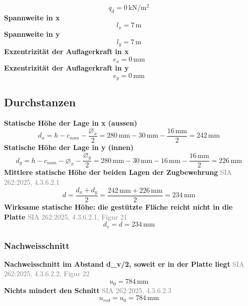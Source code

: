 \documentclass[11pt,a4paper]{article}
\newcommand{\normref}[1]{{\small\textcolor{gray}{#1}}}
\begin{document}
\begin{equation*}
q_d = 0\,\mathrm{kN}/\mathrm{m}^{2}
\end{equation*}
\noindent\textbf{Spannweite in x}
\begin{equation*}
l_x = 7\,\mathrm{m}
\end{equation*}
\noindent\textbf{Spannweite in y}
\begin{equation*}
l_y = 7\,\mathrm{m}
\end{equation*}
\noindent\textbf{Exzentrizität der Auflagerkraft in x}
\begin{equation*}
e_x = 0\,\mathrm{mm}
\end{equation*}
\noindent\textbf{Exzentrizität der Auflagerkraft in y}
\begin{equation*}
e_y = 0\,\mathrm{mm}
\end{equation*}
\subsection{Durchstanzen}
\noindent\textbf{Statische Höhe der Lage in x (aussen)}
\begin{equation*}
d_x = h - c_{nom} - \frac{\varnothing_x}{2} = 280\,\mathrm{mm} - 30\,\mathrm{mm} - \frac{16\,\mathrm{mm}}{2} = 242\,\mathrm{mm}
\end{equation*}
\noindent\textbf{Statische Höhe der Lage in y (innen)}
\begin{equation*}
d_y = h - c_{nom} - \varnothing_x - \frac{\varnothing_y}{2} = 280\,\mathrm{mm} - 30\,\mathrm{mm} - 16\,\mathrm{mm} - \frac{16\,\mathrm{mm}}{2} = 226\,\mathrm{mm}
\end{equation*}
\noindent\textbf{Mittlere statische Höhe der beiden Lagen der Zugbewehrung} \hfill \normref{SIA 262:2025, 4.3.6.2.1}
\begin{equation*}
d = \frac{d_x + d_y}{2} = \frac{242\,\mathrm{mm} + 226\,\mathrm{mm}}{2} = 234\,\mathrm{mm}
\end{equation*}
\noindent\textbf{Wirksame statische Höhe: die gestützte Fläche reicht nicht in die Platte} \hfill \normref{SIA 262:2025, 4.3.6.2.1, Figur 21}
\begin{equation*}
d_v = d = 234\,\mathrm{mm}
\end{equation*}
\subsubsection{Nachweisschnitt}
\noindent\textbf{Nachweisschnitt im Abstand d\_v/2, soweit er in der Platte liegt} \hfill \normref{SIA 262:2025, 4.3.6.2.2, Figur 22}
\begin{equation*}
u_0 = 784\,\mathrm{mm}
\end{equation*}
\noindent\textbf{Nichts mindert den Schnitt} \hfill \normref{SIA 262:2025, 4.3.6.2.3}
\begin{equation*}
u_{red} = u_0 = 784\,\mathrm{mm}
\end{equation*}
\end{document}
